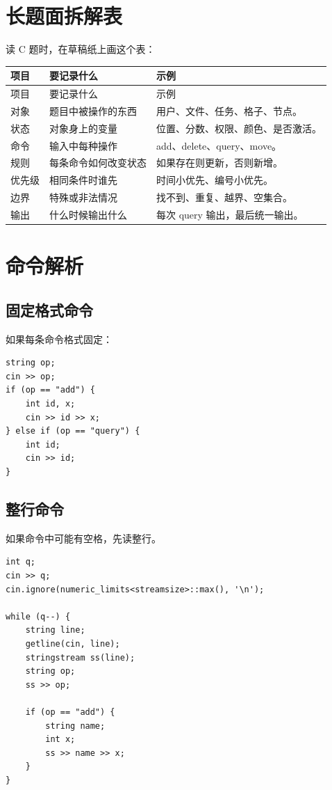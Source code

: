 \section{长题面拆解表}\label{sec:07-10}

读 C 题时，在草稿纸上画这个表：

\begin{longtable}{p{3cm}p{5cm}p{6cm}}
\toprule
项目 & 要记录什么 & 示例 \\
\midrule
\endfirsthead
\toprule
项目 & 要记录什么 & 示例 \\
\midrule
\endhead
对象 & 题目中被操作的东西 & 用户、文件、任务、格子、节点。 \\
状态 & 对象身上的变量 & 位置、分数、权限、颜色、是否激活。 \\
命令 & 输入中每种操作 & add、delete、query、move。 \\
规则 & 每条命令如何改变状态 & 如果存在则更新，否则新增。 \\
优先级 & 相同条件时谁先 & 时间小优先、编号小优先。 \\
边界 & 特殊或非法情况 & 找不到、重复、越界、空集合。 \\
输出 & 什么时候输出什么 & 每次 query 输出，最后统一输出。 \\
\bottomrule
\end{longtable}

\section{命令解析}\label{sec:07-11}

\subsection{固定格式命令}

如果每条命令格式固定：

\begin{lstlisting}
string op;
cin >> op;
if (op == "add") {
    int id, x;
    cin >> id >> x;
} else if (op == "query") {
    int id;
    cin >> id;
}
\end{lstlisting}

\subsection{整行命令}

如果命令中可能有空格，先读整行。

\begin{lstlisting}
int q;
cin >> q;
cin.ignore(numeric_limits<streamsize>::max(), '\n');

while (q--) {
    string line;
    getline(cin, line);
    stringstream ss(line);
    string op;
    ss >> op;

    if (op == "add") {
        string name;
        int x;
        ss >> name >> x;
    }
}
\end{lstlisting}

